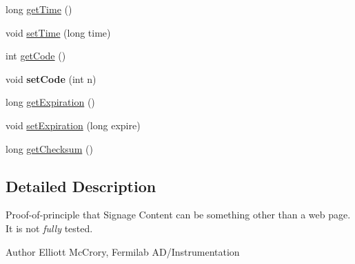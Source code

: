 \begin{DoxyCompactItemize}
\item 
long \hyperlink{classgov_1_1fnal_1_1ppd_1_1dd_1_1channel_1_1ImageContent_a02f8f320ee14917afb0fb94f7802c890}{get\-Time} ()
\item 
void \hyperlink{classgov_1_1fnal_1_1ppd_1_1dd_1_1channel_1_1ImageContent_af78af6af95d883037423fca35cf113a5}{set\-Time} (long time)
\item 
int \hyperlink{classgov_1_1fnal_1_1ppd_1_1dd_1_1channel_1_1ImageContent_a7a0feeabd65ee32a3f305c42aad14f5e}{get\-Code} ()
\item 
\hypertarget{classgov_1_1fnal_1_1ppd_1_1dd_1_1channel_1_1ImageContent_a4e30385a6fa6c69884dd5f00c4b19f56}{void {\bfseries set\-Code} (int n)}\label{classgov_1_1fnal_1_1ppd_1_1dd_1_1channel_1_1ImageContent_a4e30385a6fa6c69884dd5f00c4b19f56}

\item 
long \hyperlink{classgov_1_1fnal_1_1ppd_1_1dd_1_1channel_1_1ImageContent_a10f6c4c72d605566ec089752e734d81b}{get\-Expiration} ()
\item 
void \hyperlink{classgov_1_1fnal_1_1ppd_1_1dd_1_1channel_1_1ImageContent_ae6c23a8415f978cb4ccbb2b20f53648b}{set\-Expiration} (long expire)
\item 
long \hyperlink{classgov_1_1fnal_1_1ppd_1_1dd_1_1channel_1_1ImageContent_ae27f0af45c0765c05eaaac6ff59048ea}{get\-Checksum} ()
\end{DoxyCompactItemize}


\subsection{Detailed Description}
Proof-\/of-\/principle that Signage Content can be something other than a web page. It is not {\itshape fully} tested.

\begin{DoxyAuthor}{Author}
Elliott Mc\-Crory, Fermilab A\-D/\-Instrumentation 
\end{DoxyAuthor}


